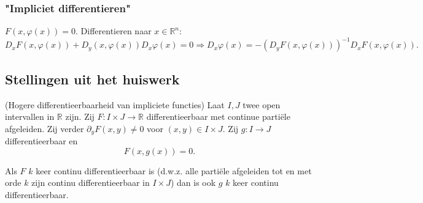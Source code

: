 \documentclass[a4paper]{exam}
\theoremstyle{definition}
\newcommand{\reals}{\mathbb{R}}
\begin{document}
			\subsubsection{"Impliciet differentieren"}
				$ F(x,\varphi(x))=0 $. Differentieren naar $ x\in \reals^n $:
				\[ D_x F(x,\varphi(x)) + D_y (x,\varphi(x))D_x \varphi(x) = 0 \Rightarrow D_x \varphi(x) = -(D_y F(x,\varphi(x)))^{-1} D_x F(x,\varphi(x)). \]
				
		\subsection{Stellingen uit het huiswerk}
			\theorem (Hogere differentieerbaarheid van impliciete functies)
				Laat $I,J$ twee open intervallen in $ \reals $ zijn. Zij $F:I \times J \to \reals$ differentieerbaar met continue parti\"ele afgeleiden. Zij verder $\partial_y F(x,y) \neq 0$ voor $(x,y) \in I \times J$. Zij $g:I\to J$ differentieerbaar en \[ F(x,g(x)) = 0. \]
				
				Als $F$ $k$ keer continu differentieerbaar is (d.w.z. alle parti\"ele afgeleiden tot en met orde $k$ zijn continu differentieerbaar in $I \times J$) dan is ook $g$ $k$ keer continu differentieerbaar.			
		
		
\end{document}
